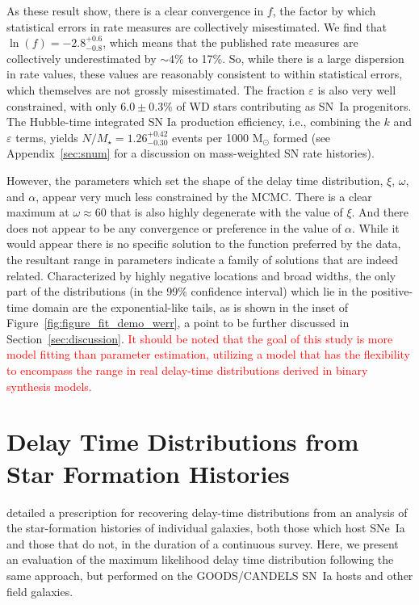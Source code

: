 \documentclass[apj, linenumbers]{aastex62}
\begin{document}
As these result show, there is a clear convergence in $f$, the factor by which statistical errors in rate measures are collectively misestimated. We find that $\ln(f) =-2.8^{+0.6}_{-0.8}$, which means that the published rate measures are collectively underestimated by $\sim4\%$ to 17\%. So, while there is a large dispersion in rate values, these values are reasonably consistent to within statistical errors, which themselves are not grossly misestimated. The fraction $\varepsilon$ is also very well constrained, with only $6.0\pm0.3\%$ of WD stars contributing as SN~Ia progenitors. The Hubble-time integrated SN Ia production efficiency, i.e., combining the $k$ and $\varepsilon$ terms, yields $N/M_{\star}=1.26^{+0.42}_{-0.30}$ events per 1000 M$_{\odot}$ formed (see Appendix~\ref{sec:snum} for a discussion on mass-weighted SN rate histories).


However, the parameters which set the shape of the delay time distribution,  $\xi$, $\omega$, and $\alpha$, appear very much less constrained by the MCMC. There is a clear maximum at $\omega\approx60$ that is also highly degenerate with the value of $\xi$.  And there does not appear to be any convergence or preference in the value of $\alpha$. While it would appear there is no specific solution to the function preferred by the data, the resultant range in parameters indicate a family of solutions that are indeed related. Characterized by highly negative locations and broad widths, the only part of the distributions (in the 99\% confidence interval) which lie in the positive-time domain are the exponential-like tails, as is shown in the inset of Figure~\ref{fig:figure_fit_demo_werr}, a point to be further discussed in Section~\ref{sec:discussion}. \textcolor{red}{It should be noted that the goal of this study is more model fitting than parameter estimation, utilizing a model that has the flexibility to encompass the range in real delay-time distributions derived in binary synthesis models.}



\section{Delay Time Distributions from Star Formation Histories}\label{sec:sfh}
\cite{Maoz:2011} detailed a prescription for recovering delay-time distributions from an analysis of the star-formation histories of individual galaxies, both those which host SNe~Ia and those that do not, in the duration of a continuous survey. Here, we present an evaluation of the maximum likelihood delay time distribution following the same approach, but performed on the GOODS/CANDELS SN~Ia hosts and other field galaxies. 
\end{document}
